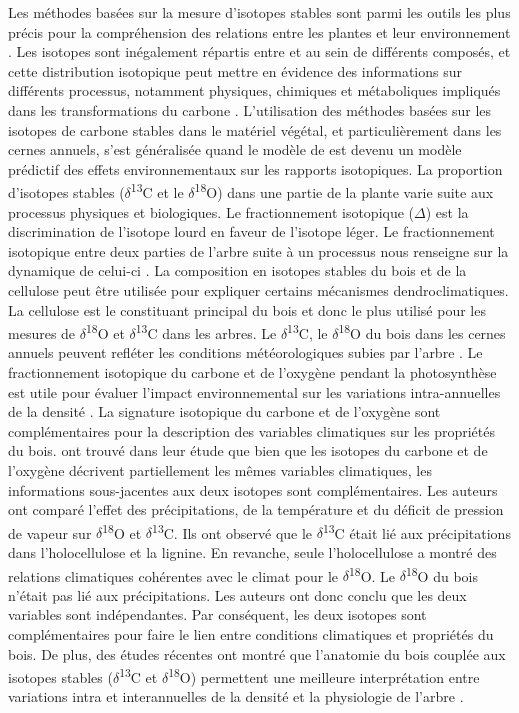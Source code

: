 \documentclass[a4paper,12pt]{report}
\newcommand{\Ctreize}{$\delta$\textsuperscript{13}C\xspace}
\newcommand{\Odixhuit}{$\delta$\textsuperscript{18}O\xspace}
\begin{document}
Les méthodes basées sur la mesure d'isotopes stables sont parmi les outils les plus précis pour la compréhension des relations entre les plantes et leur environnement \citep{Dawson2002}. Les isotopes sont inégalement répartis entre et au sein de différents composés, et cette distribution isotopique peut mettre en évidence des informations sur différents processus, notamment physiques, chimiques et métaboliques impliqués dans les transformations du carbone \citep{Farquhar1989}. L'utilisation des méthodes basées sur les isotopes de carbone stables dans le matériel végétal, et particulièrement dans les cernes annuels, s'est généralisée quand le modèle de \cite{Farquhar1989} est devenu un modèle prédictif des effets environnementaux sur les rapports isotopiques. La proportion d'isotopes stables (\Ctreize et le \Odixhuit) dans une partie de la plante varie suite aux processus physiques et biologiques. Le fractionnement isotopique ($\Delta$) est la discrimination de l'isotope lourd en faveur de l'isotope léger. Le fractionnement isotopique entre deux parties de l'arbre suite à un processus nous renseigne sur la dynamique de celui-ci \citep{Farquhar1989}. La composition en isotopes stables du bois et de la cellulose peut être utilisée pour expliquer certains mécanismes dendroclimatiques. La cellulose est le constituant principal du bois et donc le plus utilisé pour les mesures de \Odixhuit et \Ctreize dans les arbres. Le \Ctreize, le \Odixhuit du bois dans les cernes annuels peuvent refléter les conditions météorologiques subies par l'arbre \citep{Duquesnay1998,McCarroll2004,Hartl-meier2015}. Le fractionnement isotopique du carbone et de l'oxygène pendant la photosynthèse est utile pour évaluer l'impact environnemental sur les variations intra-annuelles de la densité \citep{Farquhar1989,JonLloyd1994}. La signature isotopique du carbone et de l'oxygène sont complémentaires pour la description des variables climatiques sur les propriétés du bois. \cite{FERRIO2005} ont trouvé dans leur étude que bien que les isotopes du carbone et de l'oxygène décrivent partiellement les mêmes variables climatiques, les informations sous-jacentes aux deux isotopes sont complémentaires. Les auteurs ont comparé l'effet des précipitations, de la température et du déficit de pression de vapeur sur \Odixhuit et \Ctreize. Ils ont observé que le \Ctreize était lié aux précipitations dans l'holocellulose et la lignine. En revanche, seule l'holocellulose a montré des relations climatiques cohérentes avec le climat pour le \Odixhuit. Le \Odixhuit du bois n'était pas lié aux précipitations. Les auteurs ont donc conclu que les deux variables sont indépendantes. Par conséquent, les deux isotopes sont complémentaires pour faire le lien entre conditions climatiques et propriétés du bois. De plus, des études récentes ont montré que l'anatomie du bois couplée aux isotopes stables (\Ctreize et \Odixhuit) permettent une meilleure interprétation entre variations intra et interannuelles de la densité et la physiologie de l'arbre \citep{Micco2007,Vaganov2009,Sarris2013}. \\
\end{document}
